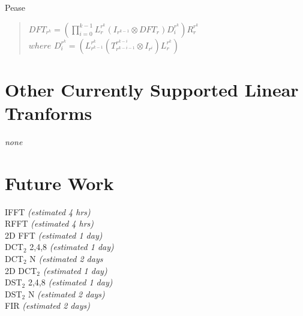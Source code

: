 \documentclass[11pt]{article}
\begin{document}
Pease
\begin{quote}$DFT_{r^{k}} = \left(\prod\limits^{k-1}_{i=0}L^{r^{k}}_{r}(I_{r^{k-1}}\otimes DFT_r)D^{r^{k}}_{i}\right)R^{r^{k}}_{r}$\\
	$where$ $D^{r^{k}}_{i} = (L^{r^{k}}_{r^{k-1}}(T^{r^{k-i}}_{r^{k-i-1}}\otimes I_{r^{i}})L^{r^{k}}_{r})$\end{quote}

\section*{Other Currently Supported Linear Tranforms}
\emph{none}\\

\newpage
\section*{Future Work}
IFFT \emph{(estimated 4 hrs)}\\
RFFT \emph{(estimated 4 hrs)}\\
2D FFT \emph{(estimated 1 day)}\\
DCT$_2$ {2,4,8} \emph{(estimated 1 day)}\\
DCT$_2$ N \emph{(estimated 2 days}\\
2D DCT$_2$ \emph{(estimated 1 day)}\\
DST$_2$ {2,4,8} \emph{(estimated 1 day)}\\
DST$_2$ N \emph{(estimated 2 days)}\\
FIR \emph{(estimated 2 days)}\\
\end{document}
